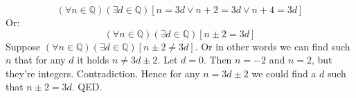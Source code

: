 \documentclass{article}
\begin{document}
$$(\forall n \in \mathbb{Q})(\exists d \in \mathbb{Q})[n=3d \vee n+2=3d \vee n+4=3d]$$
Or:
$$(\forall n \in \mathbb{Q})(\exists d \in \mathbb{Q})[n \pm 2=3d]$$
\newline
Suppose $(\forall n \in \mathbb{Q})(\exists d \in \mathbb{Q})[n \pm 2\not=3d]$. Or in other words we can find such $n$ that for any $d$ it holds $n\not=3d\pm2$. Let $d=0$. Then $n=-2$ and $n=2$, but they're integers. Contradiction. Hence for any $n=3d\pm2$ we could find a $d$ such that $n\pm2=3d$.
\newline
QED.
\end{document}
